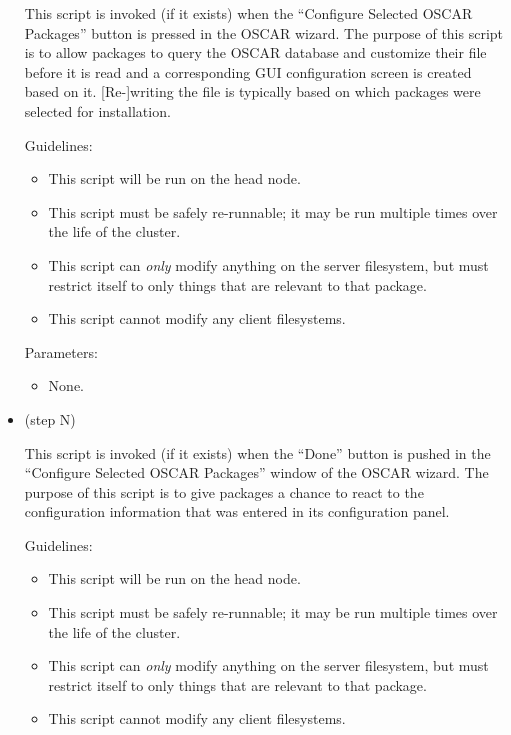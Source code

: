 \begin{itemize}
  This script is invoked (if it exists) when the ``Configure Selected
  OSCAR Packages'' button is pressed in the OSCAR wizard.  The purpose
  of this script is to allow packages to query the OSCAR database and
  customize their  file before it is read and
  a corresponding GUI configuration screen is created based on it.
  [Re-]writing the  file is typically based on
  which packages were selected for installation.

  Guidelines:

  \begin{itemize}
  \item This script will be run on the head node.
  \item This script must be safely re-runnable; it may be run multiple
    times over the life of the cluster.
  \item This script can {\em only} modify anything on the server
    filesystem, but must restrict itself to only things that are
    relevant to that package.
  \item This script cannot modify any client filesystems.
  \end{itemize}

  Parameters:
  
  \begin{itemize}
  \item None.
  \end{itemize}

\item {} (step N)
  
  This script is invoked (if it exists) when the ``Done'' button is
  pushed in the ``Configure Selected OSCAR Packages'' window of the
  OSCAR wizard.  The purpose of this script is to give packages a
  chance to react to the configuration information that was entered in
  its configuration panel.

  Guidelines:

  \begin{itemize}
  \item This script will be run on the head node.
  \item This script must be safely re-runnable; it may be run multiple
    times over the life of the cluster.
  \item This script can {\em only} modify anything on the server
    filesystem, but must restrict itself to only things that are
    relevant to that package.
  \item This script cannot modify any client filesystems.
  \end{itemize}


\end{itemize}
